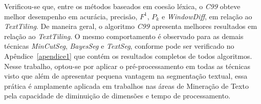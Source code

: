 Verificou-se que, entre os métodos baseados em coesão léxica, o \textit{C99} obteve melhor desempenho em acurácia, precisão, $F^1$, $P_k$ e \textit{WindowDiff}, em relação ao \textit{TextTiling}. De maneira geral, o algoritmo \textit{C99} apresenta melhores resultados em relação ao \textit{TextTiling}. 
O mesmo comportamento é observado para as demais técnicas \textit{MinCutSeg}, \textit{BayesSeg} e \textit{TextSeg}, conforme pode ser verificado no Apêndice~\ref{apendice1} que contém os resultados completos de todos algoritmos.
Nesse trabalho, optou-se por aplicar o pré-processamento em todas as técnicas visto que além de apresentar pequena vantagem na segmentação textual, essa prática é amplamente aplicada em trabalhos nas áreas de Mineração de Texto pela capacidade de diminuição de dimensões e tempo de processamento. 

















